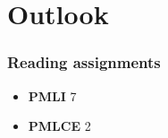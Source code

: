 \documentclass[smaller]{beamer}
\newcommand{\?}{\stackrel{?}{=}}
\begin{document}
\section{Outlook}

\begin{frame}
  \frametitle{Reading assignments}

  \begin{itemize}
  \item \textbf{PMLI} 7
  \item \textbf{PMLCE} 2
  \end{itemize}
\end{frame}




\end{document}
